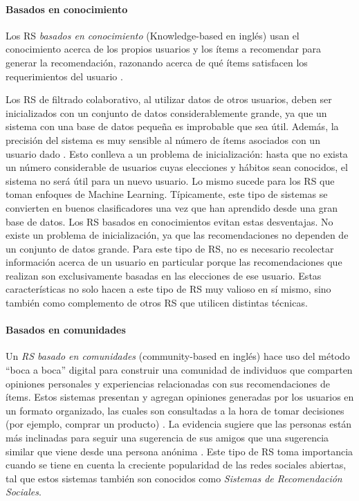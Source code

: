 \paragraph{Basados en conocimiento}
Los RS \textit{basados en conocimiento} (Knowledge-based en inglés) usan el conocimiento acerca de los propios usuarios y los ítems a recomendar para generar la recomendación, razonando acerca de qué ítems satisfacen los requerimientos del usuario \citep{burke2000knowledge}.

\bigskip Los RS de filtrado colaborativo, al utilizar datos de otros usuarios, deben ser inicializados con un conjunto de datos considerablemente grande, ya que un sistema con una base de datos pequeña es improbable que sea útil. Además, la precisión del sistema es muy sensible al número de ítems asociados con un usuario dado \citep{shardanand1995social}. Esto conlleva a un problema de inicialización: hasta que no exista un número considerable de usuarios cuyas elecciones y hábitos sean conocidos, el sistema no será útil para un nuevo usuario. Lo mismo sucede para los RS que toman enfoques de Machine Learning. Típicamente, este tipo de sistemas se convierten en buenos clasificadores una vez que han aprendido desde una gran base de datos. Los RS basados en conocimientos evitan estas desventajas. No existe un problema de inicialización, ya que las recomendaciones no dependen de un conjunto de datos grande. Para este tipo de RS, no es necesario recolectar información acerca de un usuario en particular porque las recomendaciones que realizan son exclusivamente basadas en las elecciones de ese usuario. Estas características no solo hacen a este tipo de RS muy valioso en sí mismo, sino también como complemento de otros RS que utilicen distintas técnicas.

\paragraph{Basados en comunidades}
Un \textit{RS basado en comunidades} (community-based en inglés) hace uso del método “boca a boca” digital para construir una comunidad de individuos que comparten opiniones personales y experiencias relacionadas con sus recomendaciones de ítems. Estos sistemas presentan y agregan opiniones generadas por los usuarios en un formato organizado, las cuales son consultadas a la hora de tomar decisiones (por ejemplo, comprar un producto) \citep{chen2009community}. La evidencia sugiere que las personas están más inclinadas para seguir una sugerencia de sus amigos que una sugerencia similar que viene desde una persona anónima \citep{sinha2001comparing}. Este tipo de RS toma importancia cuando se tiene en cuenta la creciente popularidad de las redes sociales abiertas, tal que estos sistemas también son conocidos como \textit{Sistemas de Recomendación Sociales}.

